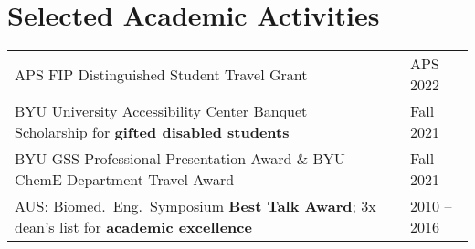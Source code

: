 \documentclass[letterpaper,11pt]{article}
\begin{document}

\vspace{-0.2cm}
\section*{Selected Academic Activities}
\begin{tabular}{@{}p{} p{} l@{}}
  APS FIP Distinguished Student Travel Grant                                                               & & APS 2022 \\[4pt]
  BYU University Accessibility Center Banquet Scholarship for \textbf{gifted disabled students}            & & Fall 2021 \\[4pt]
  BYU GSS Professional Presentation Award \& BYU ChemE Department Travel Award                             & & Fall 2021 \\[4pt]
  AUS: Biomed.\ Eng.\ Symposium \textbf{Best Talk Award}; 3x dean's list for \textbf{academic excellence}  & & 2010 -- 2016\\[4pt]

\end{tabular}
\end{document}
